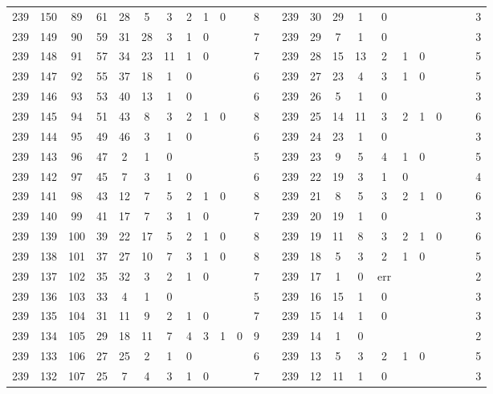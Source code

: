{\begin{tabular}{@{}cccccccccccclccccccccccc@{}}
239 & 150 & 89 & 61 & 28 & 5 & 3 & 2 & 1 & 0 &  & 8 &  & 239 & 30 & 29 & 1 & 0 &  &  &  &  &  & 3 \\
239 & 149 & 90 & 59 & 31 & 28 & 3 & 1 & 0 &  &  & 7 &  & 239 & 29 & 7 & 1 & 0 &  &  &  &  &  & 3 \\
239 & 148 & 91 & 57 & 34 & 23 & 11 & 1 & 0 &  &  & 7 &  & 239 & 28 & 15 & 13 & 2 & 1 & 0 &  &  &  & 5 \\
239 & 147 & 92 & 55 & 37 & 18 & 1 & 0 &  &  &  & 6 &  & 239 & 27 & 23 & 4 & 3 & 1 & 0 &  &  &  & 5 \\
239 & 146 & 93 & 53 & 40 & 13 & 1 & 0 &  &  &  & 6 &  & 239 & 26 & 5 & 1 & 0 &  &  &  &  &  & 3 \\
239 & 145 & 94 & 51 & 43 & 8 & 3 & 2 & 1 & 0 &  & 8 &  & 239 & 25 & 14 & 11 & 3 & 2 & 1 & 0 &  &  & 6 \\
239 & 144 & 95 & 49 & 46 & 3 & 1 & 0 &  &  &  & 6 &  & 239 & 24 & 23 & 1 & 0 &  &  &  &  &  & 3 \\
239 & 143 & 96 & 47 & 2 & 1 & 0 &  &  &  &  & 5 &  & 239 & 23 & 9 & 5 & 4 & 1 & 0 &  &  &  & 5 \\
239 & 142 & 97 & 45 & 7 & 3 & 1 & 0 &  &  &  & 6 &  & 239 & 22 & 19 & 3 & 1 & 0 &  &  &  &  & 4 \\
239 & 141 & 98 & 43 & 12 & 7 & 5 & 2 & 1 & 0 &  & 8 &  & 239 & 21 & 8 & 5 & 3 & 2 & 1 & 0 &  &  & 6 \\
239 & 140 & 99 & 41 & 17 & 7 & 3 & 1 & 0 &  &  & 7 &  & 239 & 20 & 19 & 1 & 0 &  &  &  &  &  & 3 \\
239 & 139 & 100 & 39 & 22 & 17 & 5 & 2 & 1 & 0 &  & 8 &  & 239 & 19 & 11 & 8 & 3 & 2 & 1 & 0 &  &  & 6 \\
239 & 138 & 101 & 37 & 27 & 10 & 7 & 3 & 1 & 0 &  & 8 &  & 239 & 18 & 5 & 3 & 2 & 1 & 0 &  &  &  & 5 \\
239 & 137 & 102 & 35 & 32 & 3 & 2 & 1 & 0 &  &  & 7 &  & 239 & 17 & 1 & 0 & err &  &  &  &  &  & 2 \\
239 & 136 & 103 & 33 & 4 & 1 & 0 &  &  &  &  & 5 &  & 239 & 16 & 15 & 1 & 0 &  &  &  &  &  & 3 \\
239 & 135 & 104 & 31 & 11 & 9 & 2 & 1 & 0 &  &  & 7 &  & 239 & 15 & 14 & 1 & 0 &  &  &  &  &  & 3 \\
239 & 134 & 105 & 29 & 18 & 11 & 7 & 4 & 3 & 1 & 0 & 9 &  & 239 & 14 & 1 & 0 &  &  &  &  &  &  & 2 \\
239 & 133 & 106 & 27 & 25 & 2 & 1 & 0 &  &  &  & 6 &  & 239 & 13 & 5 & 3 & 2 & 1 & 0 &  &  &  & 5 \\
239 & 132 & 107 & 25 & 7 & 4 & 3 & 1 & 0 &  &  & 7 &  & 239 & 12 & 11 & 1 & 0 &  &  &  &  &  & 3 \\

\end{tabular}}
